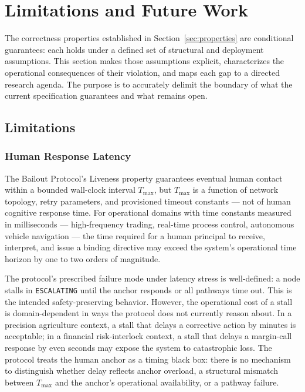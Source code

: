 \section{Limitations and Future Work}
\label{sec:limitations}

The correctness properties established in Section~\ref{sec:properties} are conditional guarantees: each holds under a defined set of structural and deployment assumptions.  This section makes those assumptions explicit, characterizes the operational consequences of their violation, and maps each gap to a directed research agenda.  The purpose is to accurately delimit the boundary of what the current specification guarantees and what remains open.

\subsection{Limitations}
\label{sec:limitations:subsection}

\subsubsection{Human Response Latency}
\label{sec:human-response-latency}

The Bailout Protocol's Liveness property guarantees eventual human contact within a bounded wall-clock interval $T_{\max}$, but $T_{\max}$ is a function of network topology, retry parameters, and provisioned timeout constants --- not of human cognitive response time.  For operational domains with time constants measured in milliseconds --- high-frequency trading, real-time process control, autonomous vehicle navigation --- the time required for a human principal to receive, interpret, and issue a binding directive may exceed the system's operational time horizon by one to two orders of magnitude.

The protocol's prescribed failure mode under latency stress is well-defined: a node stalls in \texttt{ESCALATING} until the anchor responds or all pathways time out.  This is the intended safety-preserving behavior.  However, the operational cost of a stall is domain-dependent in ways the protocol does not currently reason about.  In a precision agriculture context, a stall that delays a corrective action by minutes is acceptable; in a financial risk-interlock context, a stall that delays a margin-call response by even seconds may expose the system to catastrophic loss.  The protocol treats the human anchor as a timing black box: there is no mechanism to distinguish whether delay reflects anchor overload, a structural mismatch between $T_{\max}$ and the anchor's operational availability, or a pathway failure.

